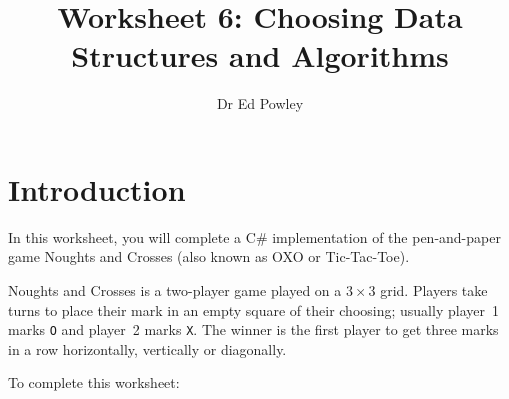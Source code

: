 \documentclass{../../../fal_assignment}
\title{Worksheet 6: Choosing Data Structures and Algorithms}
\author{Dr Ed Powley}
\begin{document}
\maketitle
{}

\section*{Introduction}

In this worksheet, you will complete a C\# implementation of the pen-and-paper game Noughts and Crosses
(also known as OXO or Tic-Tac-Toe).

Noughts and Crosses is a two-player game played on a $3 \times 3$ grid.
Players take turns to place their mark in an empty square of their choosing; usually
player~1 marks \texttt{O} and player~2 marks \texttt{X}.
The winner is the first player to get three marks in a row horizontally, vertically or diagonally.

To complete this worksheet:
\end{document}
